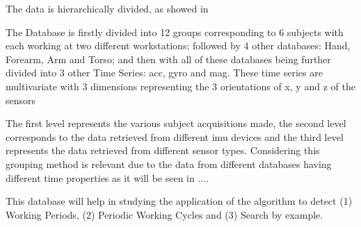 
The data is hierarchically divided, as showed in 

The Database is firstly divided into 12 groups corresponding to 6 subjects with each working at two different workstations; followed by 4 other databases: Hand, Forearm, Arm and Torso; and then with all of these databases being further divided into 3 other Time Series: \gls{acc}, \gls{gyro} and \gls{mag}. These time series are multivariate with 3 dimensions representing the 3 orientations of x, y and z of the sensors 


The first level represents the various subject acquisitions made, the second level corresponds to the data retrieved from different \gls{imu} devices and the third level represents the data retrieved from different sensor types. Considering this grouping method is relevant due to the data from different databases having different time properties as it will be seen in ....



This database will help in studying the application of the algorithm to detect (1) Working Periods, (2) Periodic Working Cycles and (3) Search by example.

